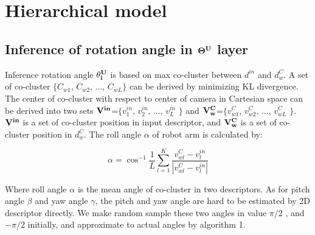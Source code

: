 \documentclass{tADR2e}
\begin{document}
\section{Hierarchical model}
\subsection{Inference of rotation angle in $\bf{\Theta^{U}}$ layer}
Inference rotation angle $\bf{\theta^{U}_i}$ is based on max co-cluster between $d^{in}$ and $d^C_w$. A set of co-cluster $\{$$C_{w1}$, $C_{w2}$, ..., $C_{wL}$$\}$ can be derived by minimizing KL divergence. The center of co-cluster with respect to center of camera in Cartesian space can be derived into two sets $\bf{V^{in}}$=$\{$$v^{in}_1$, $v^{in}_2$, ..., $v^{in}_L$ $\}$ and $\bf{V^{C}_w}$=$\{$$v^{C}_{w1}$, $v^{C}_{w2}$, ..., $v^{C}_{wL}$ $\}$. $\bf{V^{in}}$ is a set of co-cluster position in input descriptor, and $\bf{V^{C}_w}$ is a set of co-cluster position in $d^C_w$. The roll angle $\alpha$ of robot arm is calculated by:

\begin{equation}
\alpha =\cos^{-1}\frac{1}{L}\sum_{l=1}^K\frac{v^C_{wl}-v^{in}_l}{|v^C_{wl}-v^{in}_l|}
\end{equation}

Where roll angle $\alpha$ is the mean angle of co-cluster in two descriptors. As for  pitch angle $\beta$ and yaw angle $\gamma$, the pitch and yaw angle are hard to be estimated by 2D descriptor directly. We make random sample these two angles in value $\pi/2$ , and $-\pi/2$ initially, and approximate to actual angles by algorithm 1.
\end{document}
